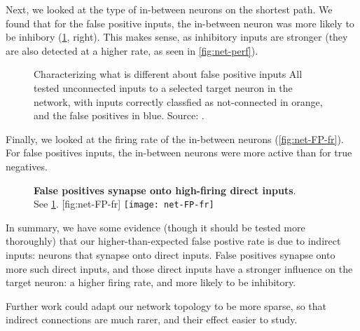 Next, we looked at the type of in-between neurons on the shortest path. We found that for the false positive inputs, the in-between neuron was more likely to be inhibory (\cref{fig:net-FP}, right). This makes sense, as inhibitory inputs are stronger (they are also detected at a higher rate, as seen in \cref{fig:net-perf}).

\begin{figure}
    \captionn
        {Characterizing what is different about false positive inputs}
        {All tested unconnected inputs to a selected target neuron in the network, with inputs correctly classfied as not-connected in orange, and the false positives in blue. Source: .}
    \label{fig:net-FP}
\end{figure}


Finally, we looked at the firing rate of the in-between neurons (\cref{fig:net-FP-fr}). For false positives inputs, the in-between neurons were more active than for true negatives.


\begin{figure}
    \begin{sidecaption}
        {\textbf{False positives synapse onto high-firing direct inputs}.\\
        See \cref{fig:net-FP}.}
        [fig:net-FP-fr]
        \texttt{[image: net-FP-fr]}
    \end{sidecaption}
\end{figure}


In summary, we have some evidence (though it should be tested more thoroughly) that our higher-than-expected false postive rate is due to indirect inputs: neurons that synapse onto direct inputs. False positives synapse onto more such direct inputs, and those direct inputs have a stronger influence on the target neuron: a higher firing rate, and more likely to be inhibitory.

Further work could adapt our network topology to be more sparse, so that indirect connections are much rarer, and their effect easier to study.

